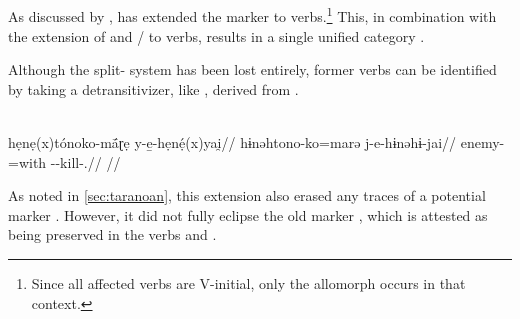 \subsection{\carijo {}}
\label{sec:carijo}
As discussed by \textcite[105--107]{meira1998proto}, \carijo has extended the  marker  to  verbs.\footnote{Since all affected  verbs are V-initial, only the  allomorph  occurs in that context.}
This, in combination with the extension of   and  / to  verbs, results in a single unified  category .
%

%
Although the split- system has been lost entirely, former  verbs can be identified by taking a detransitivizer, like  , derived from   \parencite[179]{robayo2000avance} .

\carijo \parencite[][79]{koch1908hiana}\\
\begingl
\glpreamble hẹnẹ(x)tónoko-mā́ɽẹ y-e̱-hẹnẹ́(x)yai̯//
\gla hɨnəhtono-ko=marə j-e-hɨnəhɨ-jai//
\glb enemy-=with --kill-.//
\glft {}//
\endgl
\xe
%

%

As noted in \cref{sec:taranoan}, this extension also erased any traces of a potential \PTar {} marker .
However, it did not fully eclipse the old  marker , which is attested as being preserved in the verbs    and   .

